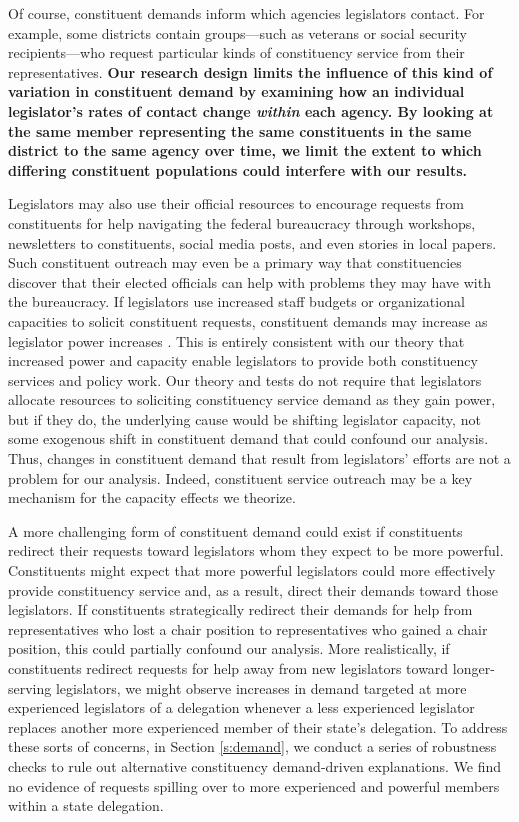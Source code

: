 \documentclass[12pt]{article}
\begin{document}
Of course, constituent demands inform which agencies legislators contact. For example, some districts contain groups---such as veterans or social security recipients---who request particular kinds of constituency service from their representatives. \textbf{Our research design limits the influence of this kind of variation in constituent demand by examining how an individual legislator's rates of contact change \textit{within} each agency. By looking at the same member representing the same constituents in the same district to the same agency over time, we limit the extent to which differing constituent populations could interfere with our results.} 

Legislators may also use their official resources to encourage requests from constituents for help navigating the federal bureaucracy through workshops, newsletters to constituents, social media posts, and even stories in local papers. Such constituent outreach may even be a primary way that constituencies discover that their elected officials can help with problems they may have with the bureaucracy. If legislators use increased staff budgets or organizational capacities to solicit constituent requests, constituent demands may increase as legislator power increases \citep{CainFerejohnFiorina1987}.  %
This is entirely consistent with our theory that increased power and capacity enable legislators to provide both constituency services and policy work. Our theory and tests do not require that legislators allocate resources to soliciting constituency service demand as they gain power, but if they do, the underlying cause would be shifting legislator capacity, not some exogenous shift in constituent demand that could confound our analysis. Thus, changes in constituent demand that result from legislators' efforts are not a problem for our analysis. Indeed, constituent service outreach may be a key mechanism for the capacity effects we theorize.

A more challenging form of constituent demand could exist if constituents redirect their requests toward legislators whom they expect to be more powerful. Constituents might expect that more powerful legislators could more effectively provide constituency service and, as a result, direct their demands toward those legislators. If constituents strategically redirect their demands for help from representatives who lost a chair position to representatives who gained a chair position, this could partially confound our analysis. More realistically, if constituents redirect requests for help away from new legislators toward longer-serving legislators, we might observe increases in demand targeted at more experienced legislators of a delegation whenever a less experienced legislator replaces another more experienced member of their state's delegation.  
To address these sorts of concerns, in Section \ref{s:demand}, we conduct a series of robustness checks to rule out alternative constituency demand-driven explanations. We find no evidence of requests spilling over to more experienced and powerful members within a state delegation.  
\end{document}
